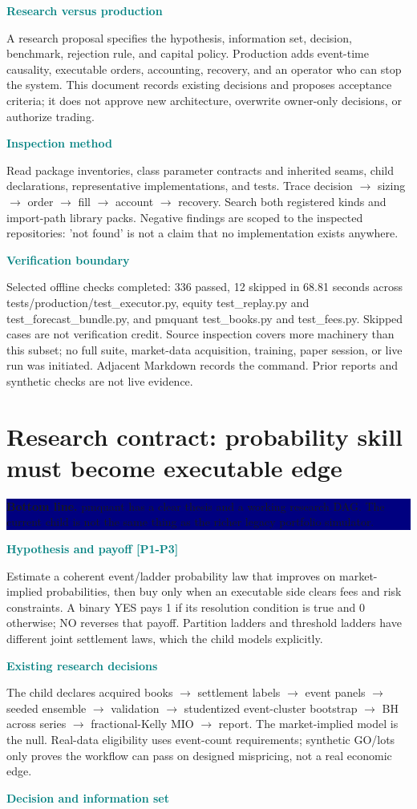 \documentclass[10pt,letterpaper]{article}
\newcommand{\bl}[1]{\noindent\colorbox{navy}{\parbox{\dimexpr\linewidth-2\fboxsep}{\color{white}\textbf{Bottom line.} #1}}\par\medskip}
\newcommand{\topic}[2]{\clearpage\section{#1}\bl{#2}}
\newcommand{\sub}[1]{\par\textbf{\textcolor{teal}{#1}}\par}
\begin{document}
\sub{Research versus production}
A research proposal specifies the hypothesis, information set, decision, benchmark, rejection rule, and capital policy. Production adds event-time causality, executable orders, accounting, recovery, and an operator who can stop the system. This document records existing decisions and proposes acceptance criteria; it does not approve new architecture, overwrite owner-only decisions, or authorize trading.
\sub{Inspection method}
Read package inventories, class parameter contracts and inherited seams, child declarations, representative implementations, and tests. Trace decision $\rightarrow$ sizing $\rightarrow$ order $\rightarrow$ fill $\rightarrow$ account $\rightarrow$ recovery. Search both registered kinds and import-path library packs. Negative findings are scoped to the inspected repositories: 'not found' is not a claim that no implementation exists anywhere.
\sub{Verification boundary}
Selected offline checks completed: 336 passed, 12 skipped in 68.81 seconds across tests/production/test\_executor.py, equity test\_replay.py and test\_forecast\_bundle.py, and pmquant test\_books.py and test\_fees.py. Skipped cases are not verification credit. Source inspection covers more machinery than this subset; no full suite, market-data acquisition, training, paper session, or live run was initiated. Adjacent Markdown records the command. Prior reports and synthetic checks are not live evidence.
\topic{Research contract: probability skill must become executable edge}{pmquant has a clear thesis and a working research DAG. The current child is not the same thing as the richer legacy portfolio simulator.}
\sub{Hypothesis and payoff [P1-P3]}
Estimate a coherent event/ladder probability law that improves on market-implied probabilities, then buy only when an executable side clears fees and risk constraints. A binary YES pays 1 if its resolution condition is true and 0 otherwise; NO reverses that payoff. Partition ladders and threshold ladders have different joint settlement laws, which the child models explicitly.
\sub{Existing research decisions}
The child declares acquired books $\rightarrow$ settlement labels $\rightarrow$ event panels $\rightarrow$ seeded ensemble $\rightarrow$ validation $\rightarrow$ studentized event-cluster bootstrap $\rightarrow$ BH across series $\rightarrow$ fractional-Kelly MIO $\rightarrow$ report. The market-implied model is the null. Real-data eligibility uses event-count requirements; synthetic GO/lots only proves the workflow can pass on designed mispricing, not a real economic edge.
\sub{Decision and information set}
\end{document}
